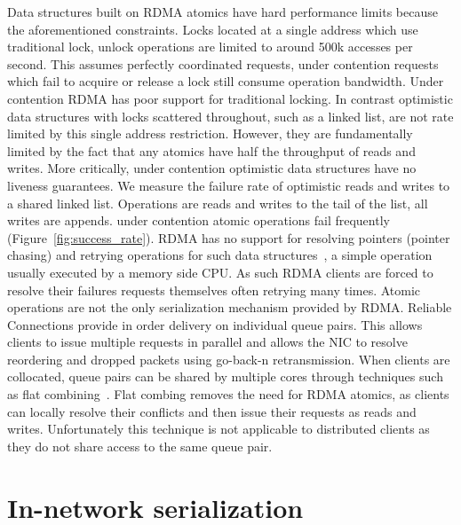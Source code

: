 Data structures built on RDMA atomics have hard performance
limits because the aforementioned constraints.  Locks
located at a single address which use traditional lock,
unlock operations are limited to around 500k accesses per
second. This assumes perfectly coordinated requests, under
contention requests which fail to acquire or release a lock
still consume operation bandwidth.
Under contention RDMA has poor support for traditional
locking. In contrast optimistic data structures with locks
scattered throughout, such as a linked list, are not rate
limited by this single address restriction.  However, they
are fundamentally limited by the fact that any atomics have
half the throughput of reads and writes. More critically,
under contention optimistic data structures have no liveness
guarantees. We measure the failure rate of optimistic reads
and writes to a shared linked list. Operations are reads and
writes to the tail of the list, all writes are appends.
under contention atomic operations fail frequently
(Figure~\ref{fig:success_rate}).  RDMA has no support for
resolving pointers (pointer chasing) and retrying operations
for such data structures~\cite{rma,snap,prism}, a simple
operation usually executed by a memory side CPU. As such
RDMA clients are forced to resolve their failures requests
themselves often retrying many times.
Atomic operations are not the only serialization mechanism
provided by RDMA. Reliable Connections provide in order
delivery on individual queue pairs. This allows clients to
issue multiple requests in parallel and allows the NIC to
resolve reordering and dropped packets using go-back-n
retransmission.  When clients are collocated, queue pairs
can be shared by multiple cores through techniques such as
flat combining~\cite{flock,sherman}. Flat combing removes
the need for RDMA atomics, as clients can locally resolve
their conflicts and then issue their requests as reads and
writes.  Unfortunately this technique is not applicable to
distributed clients as they do not share access to the same
queue pair.

\section{In-network serialization}

